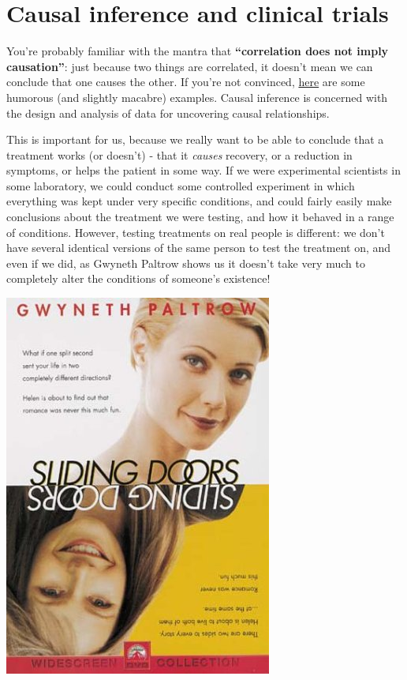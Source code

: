\documentclass[
  openany]{book}
\theoremstyle{definition}
\theoremstyle{definition}
\theoremstyle{definition}
\theoremstyle{definition}
\theoremstyle{remark}
\begin{document}
\hypertarget{causal-inference-and-clinical-trials}{%
\section{Causal inference and clinical trials}\label{causal-inference-and-clinical-trials}}

You're probably familiar with the mantra that \textbf{``correlation does not imply causation''}: just because two things are correlated, it doesn't mean we can conclude that one causes the other. If you're not convinced, \href{https://www.tylervigen.com/spurious-correlations}{here} are some humorous (and slightly macabre) examples. Causal inference is concerned with the design and analysis of data for uncovering causal relationships.

This is important for us, because we really want to be able to conclude that a treatment works (or doesn't) - that it \emph{causes} recovery, or a reduction in symptoms, or helps the patient in some way.
If we were experimental scientists in some laboratory, we could conduct some controlled experiment in which everything was kept under very specific conditions, and could fairly easily make conclusions about the treatment we were testing, and how it behaved in a range of conditions. However, testing treatments on real people is different: we don't have several identical versions of the same person to test the treatment on, and even if we did, as Gwyneth Paltrow shows us it doesn't take very much to completely alter the conditions of someone's existence!

\includegraphics{images/sliding_doors.jpeg}
\end{document}
